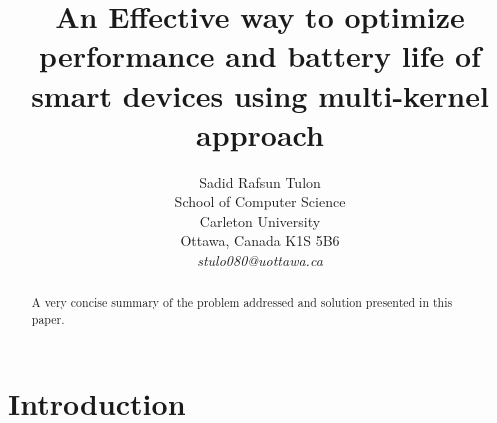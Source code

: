 \documentclass[11pt]{article}       %
\begin{document}


\title{An Effective way to optimize performance and battery life of smart devices using multi-kernel approach}


\author{
Sadid Rafsun Tulon\\
School of Computer Science\\
Carleton University\\
Ottawa, Canada K1S 5B6\\
{\em stulo080@uottawa.ca}
} %

\maketitle

\begin{abstract}
A very concise summary of the problem addressed and solution presented in this paper.
\end{abstract}

\section{Introduction} \label{intro}
\end{document}
